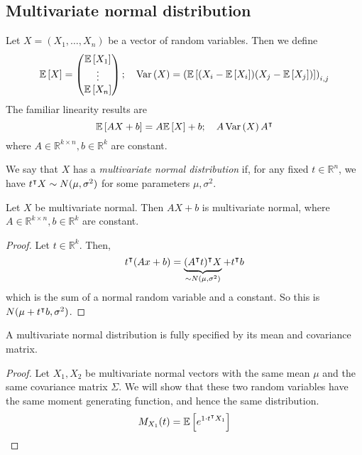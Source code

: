 \subsection{Multivariate normal distribution}
Let \( X = (X_1, \dots, X_n) \) be a vector of random variables.
Then we define
\[ \mathbb{E}\left[{X}\right] = \begin{pmatrix}
    \mathbb{E}\left[{X_1}\right] \\
    \vdots \\
    \mathbb{E}\left[{X_n}\right]
\end{pmatrix};\quad \operatorname{Var}\left({X}\right) = \qty( \mathbb{E}\left[{\qty(X_i - \mathbb{E}\left[{X_i}\right])\qty(X_j - \mathbb{E}\left[{X_j}\right])}\right] )_{i,j} \]
The familiar linearity results are
\[ \mathbb{E}\left[{AX+b}\right] = A\mathbb{E}\left[{X}\right] + b;\quad A \operatorname{Var}\left({X}\right) A^\intercal \]
where \( A \in \mathbb R^{k \times n}, b \in \mathbb R^k \) are constant.
\begin{definition}
    We say that \( X \) has a \textit{multivariate normal distribution} if, for any fixed \( t \in \mathbb R^n \), we have \( t^\intercal X \sim N(\mu, \sigma^2) \) for some parameters \( \mu, \sigma^2 \).
\end{definition}
\begin{proposition}
    Let \( X \) be multivariate normal.
    Then \( AX+b \) is multivariate normal, where \( A \in \mathbb R^{k \times n}, b \in \mathbb R^k \) are constant.
\end{proposition}
\begin{proof}
    Let \( t \in \mathbb R^k \).
    Then,
    \[ t^\intercal (Ax+b) = \underbrace{(A^\intercal t)^\intercal X}_{\sim N(\mu, \sigma^2)} + t^\intercal b \]
    which is the sum of a normal random variable and a constant.
    So this is \( N(\mu + t^\intercal b, \sigma^2) \).
\end{proof}
\begin{proposition}
    A multivariate normal distribution is fully specified by its mean and covariance matrix.
\end{proposition}
\begin{proof}
    Let \( X_1, X_2 \) be multivariate normal vectors with the same mean \( \mu \) and the same covariance matrix \( \Sigma \).
    We will show that these two random variables have the same moment generating function, and hence the same distribution.
    \[ M_{X_1}(t) = \mathbb{E}\left[{ e^{1 \cdot t^\intercal X_1} }\right] \]
\end{proof}
